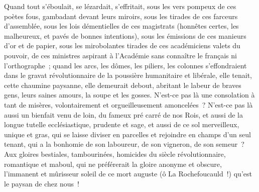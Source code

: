 \documentclass[french,twoside]{book} %
\begin{document}
Quand tout s’éboulait, se lézardait, s’effritait, sous les vers pompeux de ces poètes fous, gambadant devant leurs miroirs, sous les tirades de ces farceurs d’assemblée, sous les lois démentielles de ces magistrats (honnêtes certes, les malheureux, et pavés de bonnes intentions), sous les émissions de ces manieurs d’or et de papier, sous les mirobolantes tirades de ces académiciens valets du pouvoir, de ces ministres aspirant à l’Académie sans connaître le français ni l’orthographe ; quand les arcs, les dômes, les piliers, les colonnes s’effondraient dans le gravat révolutionnaire de la poussière humanitaire et libérale, elle tenait, cette chaumine paysanne, elle demeurait debout, abritant le labeur de braves gens, leurs saines amours, la soupe et les gosses. N’est-ce pas là une consolation à tant de misères, volontairement et orgueilleusement amoncelées ? N’est-ce pas là aussi un bienfait venu de loin, du fameux pré carré de nos Rois, et aussi de la longue tutelle ecclésiastique, prudente et sage, et aussi de ce sol merveilleux, unique et gras, qui se laisse diviser en parcelles et rejoindre en champs d’un seul tenant, qui a la bonhomie de son laboureur, de son vigneron, de son semeur ? Aux gloires bestiales, tambourinées, homicides du siècle révolutionnaire, romantique et maboul, qui ne préférerait la gloire anonyme et obscure, l’immanent et mûrisseur soleil de ce mort auguste (ô La Rochefoucauld !) qu’est le paysan de chez nous !\par
\end{document}
